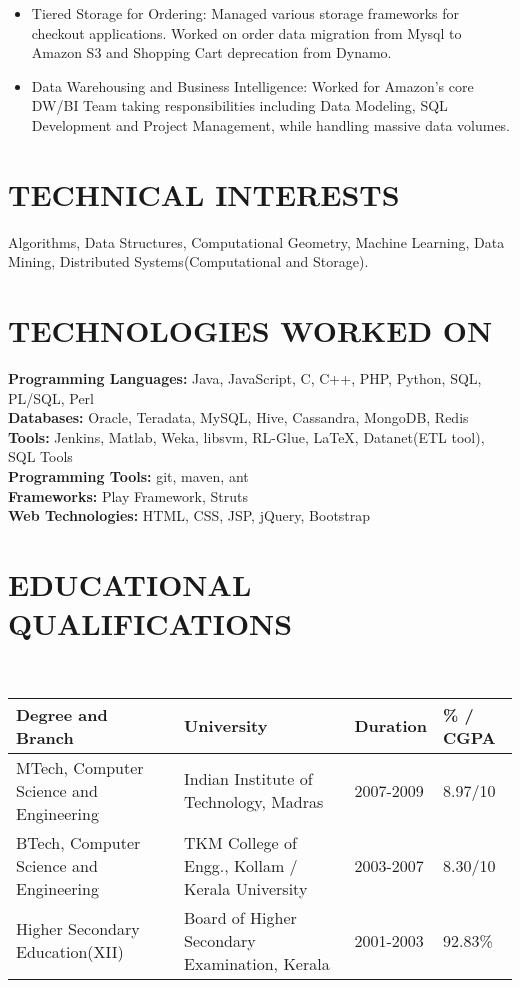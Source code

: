 \documentclass{res}
\begin{document}
\begin{resume}
\begin{itemize}

\item {Tiered Storage for Ordering:} Managed various storage frameworks for checkout applications. Worked on order data migration from Mysql to Amazon S3 and Shopping Cart deprecation from Dynamo.
\item {Data Warehousing and Business Intelligence:} Worked for Amazon's core DW/BI Team taking responsibilities including Data Modeling, SQL Development and Project Management, while handling massive data volumes. 
\end {itemize}

\section{TECHNICAL INTERESTS}  
Algorithms, Data Structures, Computational Geometry, Machine Learning, Data Mining, Distributed Systems(Computational and Storage).

\section{TECHNOLOGIES WORKED ON}
\textbf{Programming Languages:} Java, JavaScript, C, C++, PHP, Python, SQL, PL/SQL, Perl\\
\textbf{Databases:} Oracle, Teradata, MySQL, Hive, Cassandra, MongoDB, Redis\\
\textbf{Tools:} Jenkins, Matlab, Weka, libsvm, RL-Glue, LaTeX, Datanet(ETL tool), SQL Tools\\
\textbf{Programming Tools:} git, maven, ant\\
\textbf{Frameworks:} Play Framework, Struts\\
\textbf{Web Technologies:} HTML, CSS, JSP, jQuery, Bootstrap

\section{EDUCATIONAL QUALIFICATIONS}				
\textbf{\\}
\begin{tabular}{| p{4.7cm}|p{5.5cm}|p{1.6cm}|p{1.7cm}|}
\hline \textbf{Degree and Branch} & \textbf{University} & \textbf{Duration} & \textbf{\% / CGPA} \\ 
\hline MTech, Computer Science and  Engineering & Indian Institute of Technology, Madras & 2007-2009 & 8.97/10 \\ 
\hline BTech, Computer Science and  Engineering & TKM College of Engg., Kollam / Kerala University & 2003-2007 & 8.30/10 \\ 
\hline Higher Secondary Education(XII) & Board of Higher Secondary Examination, Kerala & 2001-2003 & 92.83\% \\ 


\end{tabular}
\end{resume}
\end{document}
